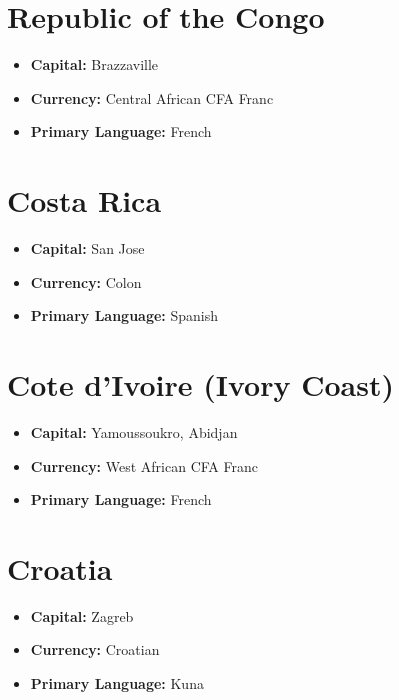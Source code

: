 \documentclass[a4paper,100pt,twoside]{book}
\begin{document}
\section*{\Huge Republic of the Congo}
\vspace{5mm} %
\begin{itemize}
	\item \textbf{Capital:} Brazzaville
	\item \textbf{Currency:} Central African CFA Franc
	\item \textbf{Primary Language:} French
\end{itemize}

\section*{\Huge Costa Rica}
\vspace{5mm} %
\begin{itemize}
	\item \textbf{Capital:} San Jose
	\item \textbf{Currency:} Colon
	\item \textbf{Primary Language:} Spanish
\end{itemize}

\section*{\Huge Cote d'Ivoire (Ivory Coast)}
\vspace{5mm} %
\begin{itemize}
	\item \textbf{Capital:} Yamoussoukro, Abidjan
	\item \textbf{Currency:} West African CFA Franc
	\item \textbf{Primary Language:} French
\end{itemize}

\section*{\Huge Croatia}
\vspace{5mm} %
\begin{itemize}
	\item \textbf{Capital:} Zagreb
	\item \textbf{Currency:} Croatian
	\item \textbf{Primary Language:} Kuna
\end{itemize}
\end{document}
